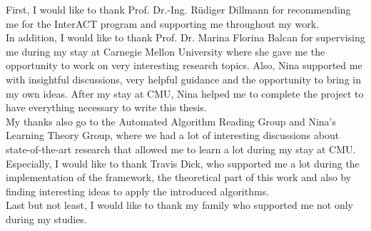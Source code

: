 \acks

First, I would like to thank Prof. Dr.-Ing. R\"{u}diger Dillmann for recommending me for the InterACT program and supporting me throughout my work.\\

In addition, I would like to thank Prof. Dr. Marina Florina Balcan for supervising me during my stay at Carnegie Mellon University where she gave me the opportunity to work on very interesting research topics. Also, Nina supported me with insightful discussions, very helpful guidance and the opportunity to bring in my own ideas. After my stay at CMU, Nina helped me to complete the project to have everything necessary to write this thesis.\\

My thanks also go to the Automated Algorithm Reading Group and Nina's Learning Theory Group, where we had a lot of interesting discussions about state-of-the-art research that allowed me to learn a lot during my stay at CMU. Especially, I would like to thank Travis Dick, who supported me a lot during the implementation of the framework, the theoretical part of this work and also by finding interesting ideas to apply the introduced algorithms.\\

Last but not least, I would like to thank my family who supported me not only during my studies.